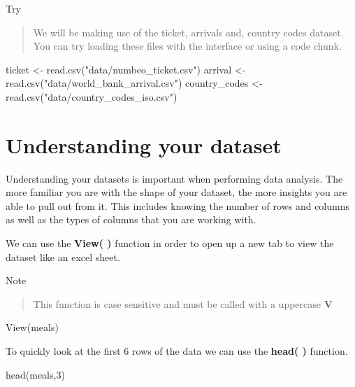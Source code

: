 \documentclass[
]{book}
\newenvironment{Shaded}{\begin{snugshade}}{\end{snugshade}}
\newcommand{\DecValTok}[1]{\textcolor[rgb]{0.00,0.00,0.81}{#1}}
\newcommand{\FunctionTok}[1]{\textcolor[rgb]{0.00,0.00,0.00}{#1}}
\newcommand{\NormalTok}[1]{#1}
\newcommand{\OtherTok}[1]{\textcolor[rgb]{0.56,0.35,0.01}{#1}}
\newcommand{\StringTok}[1]{\textcolor[rgb]{0.31,0.60,0.02}{#1}}
\begin{document}
Try

\begin{quote}
We will be making use of the ticket, arrivals and, country codes dataset. You can try loading these files with the interface or using a code chunk.
\end{quote}

\begin{Shaded}
\begin{Highlighting}[]
\NormalTok{ticket }\OtherTok{\textless{}{-}} \FunctionTok{read.csv}\NormalTok{(}\StringTok{"data/numbeo\_ticket.csv"}\NormalTok{)}
\NormalTok{arrival }\OtherTok{\textless{}{-}} \FunctionTok{read.csv}\NormalTok{(}\StringTok{"data/world\_bank\_arrival.csv"}\NormalTok{)}
\NormalTok{country\_codes }\OtherTok{\textless{}{-}} \FunctionTok{read.csv}\NormalTok{(}\StringTok{"data/country\_codes\_iso.csv"}\NormalTok{)}
\end{Highlighting}
\end{Shaded}

\hypertarget{understanding-your-dataset}{%
\section{Understanding your dataset}\label{understanding-your-dataset}}

Understanding your datasets is important when performing data analysis. The more familiar you are with the shape of your dataset, the more insights you are able to pull out from it. This includes knowing the number of rows and columns as well as the types of columns that you are working with.

We can use the \textbf{View( )} function in order to open up a new tab to view the dataset like an excel sheet.

Note

\begin{quote}
This function is case sensitive and must be called with a uppercase \textbf{V}
\end{quote}

\begin{Shaded}
\begin{Highlighting}[]
\FunctionTok{View}\NormalTok{(meals)}
\end{Highlighting}
\end{Shaded}

To quickly look at the first 6 rows of the data we can use the \textbf{head( )} function.

\begin{Shaded}
\begin{Highlighting}[]
\FunctionTok{head}\NormalTok{(meals,}\DecValTok{3}\NormalTok{)}
\end{Highlighting}
\end{Shaded}
\end{document}
